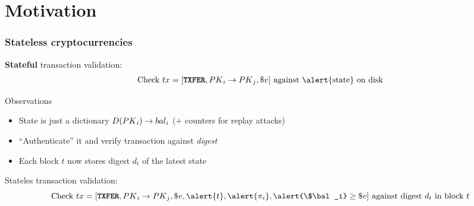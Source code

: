 \section{Motivation}

\begin{frame}
    \frametitle{Stateless cryptocurrencies}

    \textbf{Stateful} transaction validation:
    \begin{align*}
    \text{Check}\ \tx=[\txfer, \PK_i \rightarrow \PK_j, \$v]\ \text{against \alert{state} on disk}
    \end{align*}

    \begin{alertblock}{Observations}
        \begin{itemize}
        \item State is just a dictionary $D({PK}_i)\rightarrow {bal}_i$ (+ counters for replay attacks)
        \item ``Authenticate'' it and verify transaction against \textit{digest}
        \item Each block $t$ now stores digest $d_t$ of the latest state
        \end{itemize}
    \end{alertblock}

    \alert{Stateles} transaction validation:
    \begin{equation*}
    \text{Check}\ \tx=[\txfer, \PK_i \rightarrow \PK_j, \$v, \alert{t}, \alert{\pi_i}, \alert{\$\bal_i} \ge \$v]\ \text{against digest}\ d_t\ \text{in block}\ t
    \end{equation*}
\end{frame}

